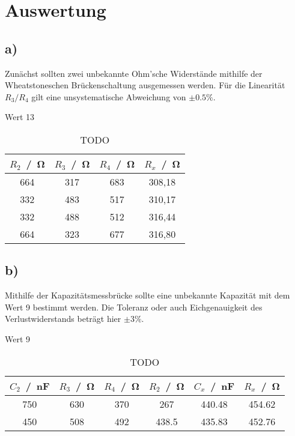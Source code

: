 \section{Auswertung} \label{sec:Auswertung}
\subsection{a)} %
Zunächst sollten zwei unbekannte Ohm'sche Widerstände mithilfe der Wheatstoneschen Brückenschaltung ausgemessen werden.
Für die Linearität $R_3/R_4$ gilt eine unsystematische Abweichung von $\pm 0.5 \%$.

Wert 13

\begin{table}
\centering
\caption{TODO}
\label{tab:todo1}
\begin{tabular}{c c c c}
\toprule
$R_2$ \,/\, \si{\ohm} &
$R_3$ \,/\, \si{\ohm} &
$R_4$ \,/\, \si{\ohm} &
$R_x$ \,/\, \si{\ohm} \\
\midrule
664	& 317 &	683	&	308,18 \\
332	& 483 &	517	&	310,17 \\
332	& 488 &	512	&	316,44 \\
664	& 323 &	677	&	316,80 \\
\bottomrule
\end{tabular}
\end{table}

\subsection{b)}
Mithilfe der Kapazitätsmessbrücke sollte eine unbekannte Kapazität mit dem Wert 9 bestimmt werden.
Die Toleranz oder auch Eichgenauigkeit des Verlustwiderstands beträgt hier $\pm 3\%$.

Wert 9

\begin{table}
  \centering
  \caption{TODO}
  \label{tab:todo2}
  \begin{tabular}{c c c c c c}
    \toprule
    $C_2$ \,/\, \si{\nano\farad} &
    $R_3$ \,/\, \si{\ohm} &
    $R_4$ \,/\, \si{\ohm} &
    $R_2$ \,/\, \si{\ohm} &
    $C_x$ \,/\, \si{\nano\farad} &
    $R_x$ \,/\, \si{\ohm} \\
    \midrule
    750 &	630 &	370 &	267		& 440.48 & 454.62 \\
    450 &	508 &	492 &	438.5	&	435.83 & 452.76 \\
    \bottomrule
  \end{tabular}
\end{table}


